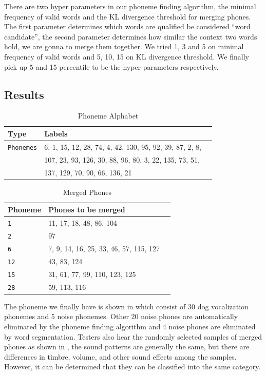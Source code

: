 There are two hyper parameters in our phoneme finding algorithm, the minimal frequency of valid words and the KL divergence threshold for merging phones. The first parameter determines which words are qualified be considered ``word candidate'', the second parameter determines how similar the context two words hold, we are gonna to merge them together. We tried 1, 3 and 5 on minimal frequency of valid words and 5, 10, 15 on KL divergence threshold. We finally pick up 5 and 15 percentile to be the hyper parameters respectively.

\subsection{Results}

\begin{table}[th]
\centering
\small
\begin{tabular}{lll}
\hline
\textbf{Type} & \textbf{Labels}\\
\hline
\verb|Phonemes| & 6, 1, 15, 12, 28, 74, 4, 42, 130, 95, 92, 39, 87, 2, 8, \\
& 107, 23, 93, 126, 30, 88, 96, 80, 3, 22, 135, 73, 51, \\
&137, 129, 70, 90, 66, 136, 21 \\\hline
\end{tabular}
\caption{Phoneme Alphabet}
\label{tab:pa}
\end{table}

\begin{table}[th]
\centering
\small
\begin{tabular}{lll}
\hline
\textbf{Phoneme} & \textbf{Phones to be merged}\\
\hline
\verb|1| & 11, 17, 18, 48, 86, 104  \\
\verb|2| & 97 \\
\verb|6| & 7, 9, 14, 16, 25, 33, 46, 57, 115, 127 \\
\verb|12| & 43, 83, 124 \\
\verb|15| & 31, 61, 77, 99, 110, 123, 125 \\
\verb|28| &59, 113, 116 \\\hline
\end{tabular}
\caption{Merged Phones}
\label{tab:mp}
\end{table}

The phoneme we finally have is shown in  which consist of 30 dog vocalization phonemes and 5 noise phonemes. Other 20 noise phones are automatically eliminated by the phoneme finding algorithm and 4 noise phones are eliminated by word segmentation. Testers also hear the randomly selected samples of merged phones as shown in , the sound patterns are generally the same, but there are differences in timbre, volume, and other sound effects among the samples. However, it can be determined that they can be classified into the same category.


